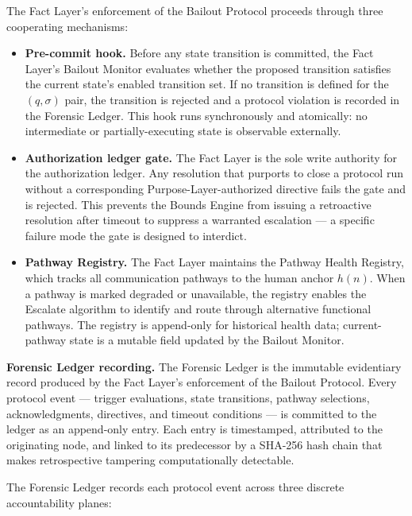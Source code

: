 The Fact Layer's enforcement of the Bailout Protocol proceeds through three cooperating mechanisms:

\begin{itemize}\itemsep=0pt
\item[(\textit{i})] \textbf{Pre-commit hook.} Before any state transition is committed, the Fact Layer's Bailout Monitor evaluates whether the proposed transition satisfies the current state's enabled transition set. If no transition is defined for the $(q, \sigma)$ pair, the transition is rejected and a protocol violation is recorded in the Forensic Ledger. This hook runs synchronously and atomically: no intermediate or partially-executing state is observable externally.

\item[(\textit{ii})] \textbf{Authorization ledger gate.} The Fact Layer is the sole write authority for the authorization ledger. Any resolution that purports to close a protocol run without a corresponding Purpose-Layer-authorized directive fails the gate and is rejected. This prevents the Bounds Engine from issuing a retroactive resolution after timeout to suppress a warranted escalation --- a specific failure mode the gate is designed to interdict.

\item[(\textit{iii})] \textbf{Pathway Registry.} The Fact Layer maintains the Pathway Health Registry, which tracks all communication pathways to the human anchor $h(n)$. When a pathway is marked degraded or unavailable, the registry enables the Escalate algorithm to identify and route through alternative functional pathways. The registry is append-only for historical health data; current-pathway state is a mutable field updated by the Bailout Monitor.
\end{itemize}

\bigskip
\noindent\textbf{Forensic Ledger recording.} The Forensic Ledger is the immutable evidentiary record produced by the Fact Layer's enforcement of the Bailout Protocol. Every protocol event --- trigger evaluations, state transitions, pathway selections, acknowledgments, directives, and timeout conditions --- is committed to the ledger as an append-only entry. Each entry is timestamped, attributed to the originating node, and linked to its predecessor by a SHA-256 hash chain that makes retrospective tampering computationally detectable.

The Forensic Ledger records each protocol event across three discrete accountability planes:


